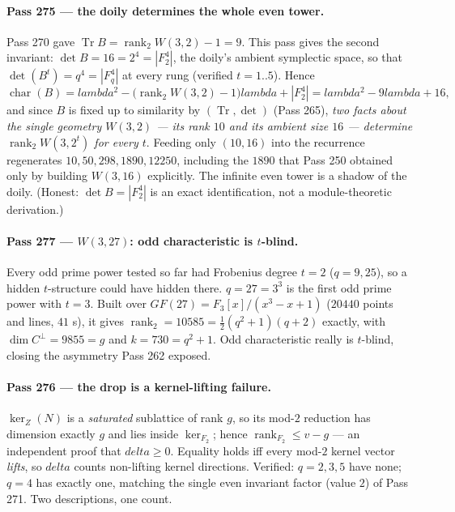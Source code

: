 \documentclass[12pt,a4paper]{article}
\def\mathrm#1{#1}%
\def\mathbf#1{#1}%
\def\delta{delta}%
\def\lambda{lambda}%
\theoremstyle{definition}
\begin{document}
\paragraph{Pass 275 --- the doily determines the whole even tower.} Pass 270 gave
$\operatorname{Tr}B=\operatorname{rank}_2W(3,2)-1=9$. This pass gives the second
invariant: $\det B=16=2^4=|\mathbf F_2^4|$, the doily's ambient symplectic space,
so that $\det(B^t)=q^4=|\mathbf F_q^4|$ at every rung (verified $t=1..5$). Hence
\[
   \operatorname{char}(B)=\lambda^2-\bigl(\operatorname{rank}_2W(3,2)-1\bigr)\lambda+|\mathbf F_2^4|
   =\lambda^2-9\lambda+16 ,
\]
and since $B$ is fixed up to similarity by $(\operatorname{Tr},\det)$ (Pass 265),
\emph{two facts about the single geometry $W(3,2)$ --- its rank $10$ and its
ambient size $16$ --- determine $\operatorname{rank}_2W(3,2^t)$ for every $t$}.
Feeding only $(10,16)$ into the recurrence regenerates $10,50,298,1890,12250$,
including the $1890$ that Pass 250 obtained only by building $W(3,16)$ explicitly.
The infinite even tower is a shadow of the doily. (Honest: $\det B=|\mathbf F_2^4|$
is an exact identification, not a module-theoretic derivation.)

\paragraph{Pass 277 --- $W(3,27)$: odd characteristic is $t$-blind.} Every odd
prime power tested so far had Frobenius degree $t=2$ ($q=9,25$), so a hidden
$t$-structure could have hidden there. $q=27=3^3$ is the first odd prime power
with $t=3$. Built over $\mathrm{GF}(27)=\mathbf F_3[x]/(x^3-x+1)$ ($20440$ points
and lines, $41$ s), it gives $\operatorname{rank}_2=\mathbf{10585}
=\tfrac12(q^2+1)(q+2)$ exactly, with $\dim C^{\perp}=9855=g$ and $k=730=q^2+1$.
Odd characteristic really is $t$-blind, closing the asymmetry Pass 262 exposed.

\paragraph{Pass 276 --- the drop is a kernel-lifting failure.} $\ker_{\mathbf Z}(N)$
is a \emph{saturated} sublattice of rank $g$, so its mod-$2$ reduction has
dimension exactly $g$ and lies inside $\ker_{\mathbf F_2}$; hence
$\operatorname{rank}_{\mathbf F_2}\le v-g$ --- an independent proof that
$\delta\ge0$. Equality holds iff every mod-$2$ kernel vector \emph{lifts}, so
$\delta$ counts non-lifting kernel directions. Verified: $q=2,3,5$ have none;
$q=4$ has exactly one, matching the single even invariant factor (value $2$) of
Pass 271. Two descriptions, one count.
\end{document}
